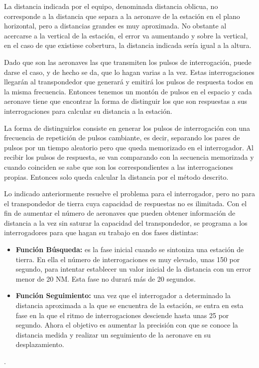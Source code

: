 La distancia indicada por el equipo, denominada distancia oblicua, no corresponde a la distancia que separa a la aeronave de la estaci\'on en el plano horizontal, pero a distancias grandes es muy aproximada. No obstante al acercarse a la vertical de la estaci\'on, el error va aumentando y sobre la vertical, en el caso de que existiese cobertura, la distancia indicada ser\'ia igual a la altura.

Dado que son las aeronaves las que transmiten los pulsos de interrogaci\'on, puede darse el caso, y de hecho se da, que lo hagan varias a la vez. Estas interrogaciones llegar\'an al transpondedor que generar\'a y emitir\'a los pulsos de respuesta todos en la misma frecuencia. Entonces tenemos un mont\'on de pulsos en el espacio y cada aeronave tiene que encontrar la forma de distinguir los que son respuestas a sus interrogaciones para calcular su distancia a la estaci\'on.

La forma de distinguirlos consiste en generar los pulsos de interrogaci\'on con una frecuencia de repetici\'on de pulsos cambiante, es decir, separando los pares de pulsos por un tiempo aleatorio pero que queda memorizado en el interrogador. Al recibir los pulsos de respuesta, se van comparando con la secuencia memorizada y cuando coinciden se sabe que son los correspondientes a las interrogaciones propias. Entonces solo queda calcular la distancia por el m\'etodo descrito.

Lo indicado anteriormente resuelve el problema para el interrogador, pero no para el transpondedor de tierra cuya capacidad de respuestas no es ilimitada. Con el fin de aumentar el n\'umero de aeronaves que pueden obtener informaci\'on de distancia a la vez sin saturar la capacidad del transpondedor, se programa a los interrogadores para que hagan su trabajo en dos fases distintas:

\begin{itemize}
	\item \textbf{Funci\'on B\'usqueda:} es la fase inicial cuando se sintoniza una estaci\'on de tierra. En ella el n\'umero de interrogaciones es muy elevado, unas 150 por segundo, para intentar establecer un valor inicial de la distancia con un error menor de 20 NM. Esta fase no durar\'a m\'as de 20 segundos.
        \item \textbf{Funci\'on Seguimiento:} una vez que el interrogador a determinado la distancia aproximada a la que se encuentra de la estaci\'on, se entra en esta fase en la que el ritmo de interrogaciones desciende hasta unas 25 por segundo. Ahora el objetivo es aumentar la precisi\'on con que se conoce la distancia medida y realizar un seguimiento de la aeronave en su desplazamiento.
\end{itemize}.

